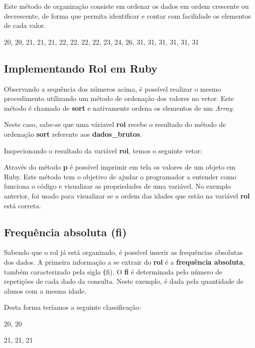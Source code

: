 \documentclass[espaco=simples,appendix=Name]{abnt}
\newcommand{\code}[1] {\textbf{#1}}
\begin{document}
Este método de organização consiste em ordenar os dados em ordem crescente ou decrescente, de forma que permita identificar e contar com facilidade os elementos de cada valor.

20, 20, 21, 21, 21, 22, 22, 22, 22, 23, 24, 26, 31, 31, 31, 31, 31, 31

\subsection { Implementando Rol em Ruby }

Observando a sequência dos números acima, é possível realizar o mesmo procedimento utilizando um método de ordenação dos valores no vetor. Este método é chamado de \code{sort} e nativamente ordena os elementos de um \textit{Array}.

 

Neste caso, sabe-se que uma váriavel \code{rol} recebe o resultado do método de ordenação \code{sort} referente aos \code{dados\_brutos}.

Inspecionando o resultado da variável \code{rol}, temos o seguinte vetor:

 

Através do método \code{p} é possível imprimir em tela os valores de um objeto em Ruby. Este método tem o objetivo de ajudar o programador a entender como funciona o código e visualizar as propriedades de uma variável. No exemplo anterior, foi usado para visualizar se a ordem das idades que estão na variável \code{rol} está correta.


\subsection { Frequência absoluta (fi) }

Sabendo que o rol já está organizado, é possível inserir  as frequências absolutas dos dados. A primeira informação a se extrair do \code{rol} é a \code{frequência absoluta}, também caracterizado pela sigla \code(fi). O \code{fi} é determinada pelo número de repetições de cada dado da consulta. Neste exemplo, é dada pela quantidade de alunos com a mesma idade.

Desta forma teríamos a seguinte classificação:

20, 20

21, 21, 21
\end{document}
